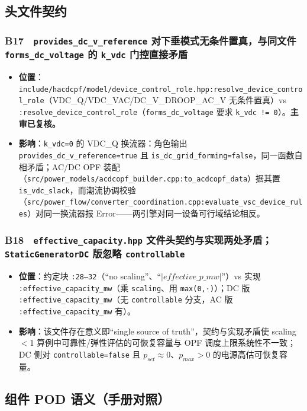 \documentclass[11pt,a4paper,fontset=fandol]{ctexart}
\newcommand{\file}[1]{\texttt{#1}}
\begin{document}
\subsection{头文件契约}

\subsubsection*{B17　\texttt{provides\_dc\_v\_reference} 对下垂模式无条件置真，与同文件 \texttt{forms\_dc\_voltage} 的 \texttt{k\_vdc} 门控直接矛盾}
\begin{itemize}
  \item \textbf{位置}：\file{include/hacdcpf/model/device\_control\_role.hpp:resolve\_device\_control\_role}（VDC\_Q/VDC\_VAC/DC\_V\_DROOP\_AC\_V 无条件置真）vs \file{:resolve\_device\_control\_role}（\texttt{forms\_dc\_voltage} 要求 \texttt{k\_vdc != 0}）。\textbf{主审已复核。}
  \item \textbf{影响}：\texttt{k\_vdc=0} 的 VDC\_Q 换流器：角色输出 \texttt{provides\_dc\_v\_reference=true} 且 \texttt{is\_dc\_grid\_forming=false}，同一函数自相矛盾；AC/DC OPF 装配（\file{src/power\_models/acdcopf\_builder.cpp:to\_acdcopf\_data}）据其置 \texttt{is\_vdc\_slack}，而潮流协调校验（\file{src/power\_flow/converter\_coordination.cpp:evaluate\_vsc\_device\_rules}）对同一换流器报 Error——两引擎对同一设备可行域结论相反。
\end{itemize}

\subsubsection*{B18　\texttt{effective\_capacity.hpp} 文件头契约与实现两处矛盾；\texttt{StaticGeneratorDC} 版忽略 \texttt{controllable}}
\begin{itemize}
  \item \textbf{位置}：约定块 \file{:28--32}（``no scaling''、``$|effective\_p\_mw|$''）vs 实现 \file{:effective\_capacity\_mw}（乘 \texttt{scaling}、用 \texttt{max(0,·)}）；DC 版 \file{:effective\_capacity\_mw}（无 \texttt{controllable} 分支，AC 版 \file{:effective\_capacity\_mw} 有）。
  \item \textbf{影响}：该文件存在意义即``single source of truth''，契约与实现矛盾使 scaling$<$1 算例中可靠性/弹性评估的可恢复容量与 OPF 调度上限系统性不一致；DC 侧对 \texttt{controllable=false} 且 $p_{set}\approx0$、$p_{max}>0$ 的电源高估可恢复容量。
\end{itemize}

\subsection{组件 POD 语义（手册对照）}
\end{document}
